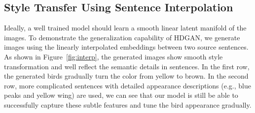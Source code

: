 \documentclass[10pt,twocolumn,letterpaper]{article}
\begin{document}
\subsection{Style Transfer Using Sentence Interpolation}
Ideally, a well trained model should learn a smooth linear latent manifold of the images. To demonstrate the generalization capability of HDGAN, we generate images using the linearly interpolated embeddings between two source sentences. %
As shown in Figure~\ref{fig:interp}, the generated images show smooth style transformation and well reflect the semantic details in sentences. 
In the first row, the generated birds gradually turn the color from yellow to brown. In the second row, more complicated sentences with detailed appearance descriptions (e.g., blue peaks and yellow wing) are used, we can see that our model is still be able to successfully capture these subtle features and tune the bird appearance gradually. 




\end{document}
